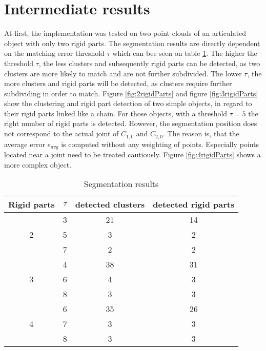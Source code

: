 \section{Intermediate results}

At first, the implementation was tested on two point clouds of an articulated object with only two rigid parts. The segmentation results are directly dependent on the matching error threshold $\tau$ which can bee seen on table \ref{table:segmentation_results}. The higher the threshold $\tau$, the less clusters and subsequently rigid parts can be detected, as two clusters are more likely to match and are not further subdivided. The lower $\tau$, the more clusters and rigid parts will be detected, as clusters require further subdividing in order to match. Figure \ref{fig:2rigidParts} and figure \ref{fig:3rigidParts} show the clustering and rigid part detection of two simple objects, in regard to their rigid parts linked like a chain. For those objects, with a threshold $\tau = 5$ the right number of rigid parts is detected. However, the segmentation position does not correspond to the actual joint of $C_{1,0}$ and $C_{2,0}$. The reason is, that the average error $e_{avg}$ is computed without any weighting of points. Especially points located near a joint need to be treated cautiously. Figure \ref{fig:4rigidParts} shows a more complex object.
\begin{table}
	\centering\small
	\begin{tabular}{ |c|c|c|c| } 
		\hline
		Rigid parts & $\tau$ & detected clusters & detected rigid parts \\
		\hline
		& 3 & 21 & 14 \\ 
		2& 5 & 3 & 2 \\
		& 7 & 2 & 2 \\
		\hline
		& 4 & 38 & 31 \\ 
		3 & 6 & 4 & 3 \\
		& 8 & 3 & 3 \\
		\hline
		& 6 & 35 & 26 \\ 
		4 & 7 & 3 & 3 \\
		& 8 & 3 & 3 \\
		\hline
	\end{tabular}
	\caption{Segmentation results}
	\label{table:segmentation_results}
\end{table}
